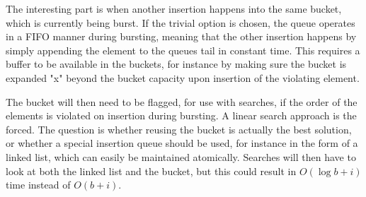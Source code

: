 \documentclass[11pt,a4paper]{article}
\begin{document}
The interesting part is when another insertion happens into the same bucket,
which is currently being burst. If the trivial option is chosen, the queue
operates in a FIFO manner during bursting, meaning that the other insertion
happens by simply appending the element to the queues tail in constant time.
This requires a buffer to be available in the buckets, for instance by making
sure the bucket is expanded "x" beyond the bucket capacity upon insertion of
the violating element.

The bucket will then need to be flagged, for use with searches, if the order of
the elements is violated on insertion during bursting. A linear search approach
is the forced. The question is whether reusing the bucket is actually the best
solution, or whether a special insertion queue should be used, for instance in
the form of a linked list, which can easily be maintained atomically. Searches
will then have to look at both the linked list and the bucket, but this could
result in $O(\log b + i)$ time instead of $O(b+i)$.
\end{document}
